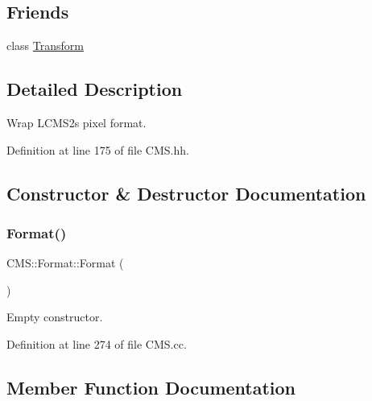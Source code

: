 \subsection*{Friends}
\begin{DoxyCompactItemize}
\item 
class \hyperlink{class_c_m_s_1_1_format_af851b4d9aacd1a871da33592334b8d72}{Transform}
\end{DoxyCompactItemize}


\subsection{Detailed Description}
Wrap L\+C\+M\+S2\textquotesingle{}s pixel format. 

Definition at line 175 of file C\+M\+S.\+hh.



\subsection{Constructor \& Destructor Documentation}
\mbox{\label{class_c_m_s_1_1_format_a36de6a3fc7a1eab08332ae5211c9c279}} 
\subsubsection{\texorpdfstring{Format()}{Format()}}
{\footnotesize\ttfamily C\+M\+S\+::\+Format\+::\+Format (\begin{DoxyParamCaption}{ }\end{DoxyParamCaption})}



Empty constructor. 



Definition at line 274 of file C\+M\+S.\+cc.



\subsection{Member Function Documentation}
\mbox{\label{class_c_m_s_1_1_format_ad38cf173ef7aeaf2d9b624fe6b6db796}} 

